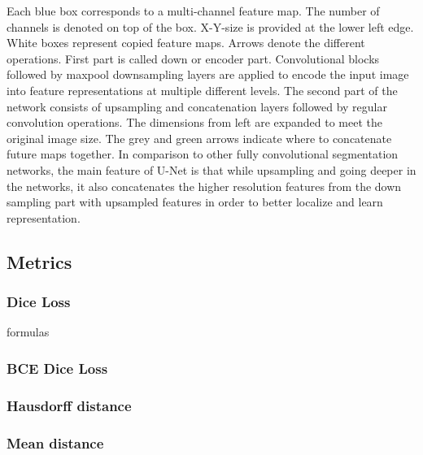 Each blue box corresponds to a multi-channel feature map. The number of channels is denoted on top of the box. X-Y-size is provided at the lower left edge. White boxes represent copied feature maps. Arrows denote the different operations.\newline
First part is called down or encoder part. Convolutional blocks followed by maxpool downsampling layers are applied to encode the input image into feature representations at multiple different levels. The second part of the network consists of upsampling and concatenation layers followed by regular convolution operations. The dimensions from left are expanded to meet the original image size. The grey and green arrows indicate where to concatenate future maps together.\newline
In comparison to other fully convolutional segmentation networks, the main feature of U-Net  is that while upsampling and going deeper in the networks, it also concatenates the higher resolution features from the down sampling part with upsampled features in order to better localize and learn representation.\newline

\subsection{Metrics}

\subsubsection{Dice Loss}
formulas
\subsubsection{BCE Dice Loss}

\subsubsection{Hausdorff distance}

\subsubsection{Mean distance}